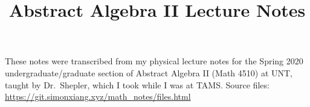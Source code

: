 \documentclass[fontsize=9pt]{article}
\title{Abstract Algebra II Lecture Notes}
\date{}
\begin{document}
\maketitle
These notes were transcribed from my physical lecture notes for the Spring 2020 undergraduate/graduate section of Abstract Algebra II (Math 4510) at UNT, taught by Dr.\ Shepler, which I took while I was at TAMS. Source files: \url{https://git.simonxiang.xyz/math_notes/files.html}

\tableofcontents
\newpage
    
    
\clearpage
\printbibliography
\end{document}
